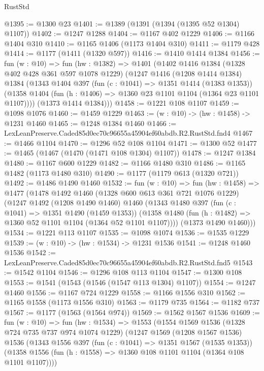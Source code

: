 \begin{lexlean}{RustStd}
\begin{coremodule}
@1395 := @1300 @23
@1401 := @1389 (@1391 (@1394 (@1395 @52 @1304) @1107))
@1402 := @1247 @1288
@1404 := @1167 @402 @1229
@1406 := @1166 @1404 @310
@1410 := @1165 @1406 (@1173 @1404 @310)
@1411 := @1179 @428
@1414 := @1177 (@1411 (@1320 @597))
@1416 := @1410 @1414 @1384
@1456 := fun (w : @10) =>
  fun (hw : @1382) =>
  @1401
    (@1402
      @1416
      @1384
      (@1328 @402 @428 @361 @597 @1078 @1229)
      (@1247
        @1416
        (@1208 @1414 @1384)
        @1384
        (@1343
          @1404
          @397
          (fun (c : @1041) => @1351 @1414 (@1383 @1353))
          (@1358 @1404 (fun (h : @1406) => @1360 @23 @1101 @1104 (@1364 @23 @1101 @1107))))
        (@1373 @1414 @1384)))
@1458 := @1221 @108 @1107
@1459 := @1098 @1076
@1460 := @1459 @1229
@1463 := (w : @10) -> (hw : @1458) -> @1231 @1460
@1465 := @1248 @1384 @1460
@1466 := LexLeanPreserve.Caded85d0ec70c96655a45904ef60abdb.R2.RustStd.fnd4
@1467 := @1466 @1104
@1470 := @1296 @52 @108 @1104
@1471 := @1300 @52
@1477 := @1465 (@1467 (@1470 (@1471 @108 @1304) @1107))
@1478 := @1247 @1384
@1480 := @1167 @600 @1229
@1482 := @1166 @1480 @310
@1486 := @1165 @1482 (@1173 @1480 @310)
@1490 := @1177 (@1179 @613 (@1320 @721))
@1492 := @1486 @1490 @1460
@1532 := fun (w : @10) =>
  fun (hw : @1458) =>
  @1477
    (@1478
      @1492
      @1460
      (@1328 @600 @613 @361 @721 @1076 @1229)
      (@1247
        @1492
        (@1208 @1490 @1460)
        @1460
        (@1343
          @1480
          @397
          (fun (c : @1041) => @1351 @1490 (@1459 @1353))
          (@1358 @1480 (fun (h : @1482) => @1360 @52 @1101 @1104 (@1364 @52 @1101 @1107))))
        (@1373 @1490 @1460)))
@1534 := @1221 @113 @1107
@1535 := @1098 @1074
@1536 := @1535 @1229
@1539 := (w : @10) -> (hw : @1534) -> @1231 @1536
@1541 := @1248 @1460 @1536
@1542 := LexLeanPreserve.Caded85d0ec70c96655a45904ef60abdb.R2.RustStd.fnd5
@1543 := @1542 @1104
@1546 := @1296 @108 @113 @1104
@1547 := @1300 @108
@1553 := @1541 (@1543 (@1546 (@1547 @113 @1304) @1107))
@1554 := @1247 @1460
@1556 := @1167 @724 @1229
@1558 := @1166 @1556 @310
@1562 := @1165 @1558 (@1173 @1556 @310)
@1563 := @1179 @735
@1564 := @1182 @737
@1567 := @1177 (@1563 (@1564 @974))
@1569 := @1562 @1567 @1536
@1609 := fun (w : @10) =>
  fun (hw : @1534) =>
  @1553
    (@1554
      @1569
      @1536
      (@1328 @724 @735 @737 @974 @1074 @1229)
      (@1247
        @1569
        (@1208 @1567 @1536)
        @1536
        (@1343
          @1556
          @397
          (fun (c : @1041) => @1351 @1567 (@1535 @1353))
          (@1358 @1556 (fun (h : @1558) => @1360 @108 @1101 @1104 (@1364 @108 @1101 @1107))))

\end{coremodule}
\end{lexlean}
